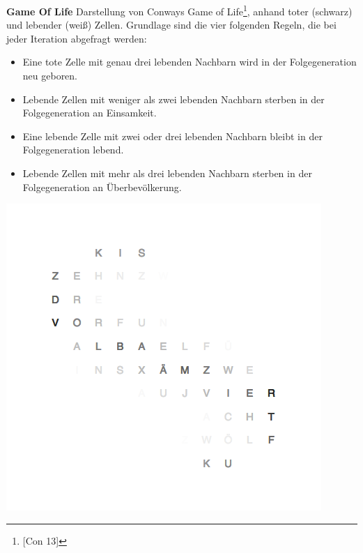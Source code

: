 \begin{multicols}{2}
\textbf{Game Of Life}
Darstellung von Conways Game of Life\footnote{[Con 13]}, anhand toter (schwarz) und lebender (weiß) Zellen.
Grundlage sind die vier folgenden Regeln, die bei jeder Iteration abgefragt werden:
\begin{itemize}
    \item Eine tote Zelle mit genau drei lebenden Nachbarn wird in der Folgegeneration neu geboren.
    \item Lebende Zellen mit weniger als zwei lebenden Nachbarn sterben in der Folgegeneration an Einsamkeit.
    \item Eine lebende Zelle mit zwei oder drei lebenden Nachbarn bleibt in der Folgegeneration lebend.
    \item Lebende Zellen mit mehr als drei lebenden Nachbarn sterben in der Folgegeneration an Überbevölkerung.
\end{itemize}
\includegraphics[width=\columnwidth]{Abbildungen/Software/Demo/Helix}


\end{multicols}
